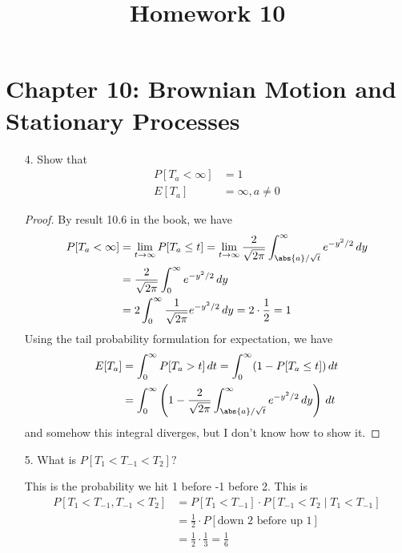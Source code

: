 \documentclass{article}
\begin{document}
\title{Homework 10}
\maketitle
\thispagestyle{fancy}

\section*{Chapter 10: Brownian Motion and Stationary Processes}

\begin{itemize}
	\item[4.] Show that
		\begin{align*}
			P[T_a<\infty] &= 1 \\
			E[T_a]&= \infty, a\neq 0
		\end{align*}
		\begin{proof}
			By result 10.6 in the book, we have
			\begin{align*}
				P[T_a<\infty] &= \lim_{t\to\infty} P[T_a\le t] = \lim_{t\to \infty} \frac{2}{\sqrt{2\pi}} \int_{\abs{a}/\sqrt{t}}^\infty e^{-y^2/2}\, dy \\
				&= \frac{2}{\sqrt{2\pi}}\int_0^\infty e^{-y^2/2}\, dy \\
				&= 2\int_0^\infty \frac{1}{\sqrt{2\pi}} e^{-y^2/2}\, dy = 2\cdot \frac{1}{2} = 1
			\end{align*}
			Using the tail probability formulation for expectation, we have
			\begin{align*}
				E[T_a] &= \int_0^\infty P[T_a>t]\, dt = \int_0^\infty (1-P[T_a\le t])\, dt \\
				&= \int_0^\infty \left( 1-\frac{2}{\sqrt{2\pi}}\int_{\abs{a}/\sqrt{t}}^\infty e^{-y^2/2}\, dy \right)\, dt
			\end{align*}
			and somehow this integral diverges, but I don't know how to show it.
		\end{proof}

	\item[5.] What is $P[T_1<T_{-1}<T_2]?$
		\begin{soln}
			This is the probability we hit 1 before -1 before 2. This is
			\begin{align*}
				P[T_1<T_{-1}, T_{-1}<T_2] &= P[T_1<T_{-1}] \cdot P[T_{-1}<T_2\mid T_1<T_{-1}] \\
				&= \frac{1}{2} \cdot P[\text{down 2 before up 1}] \\
				&= \frac{1}{2}\cdot \frac{1}{3} = \frac{1}{6}
			\end{align*}
		\end{soln}


\end{itemize}
\end{document}
